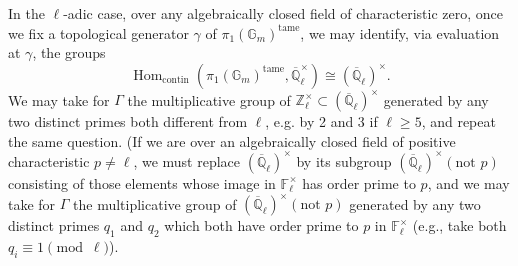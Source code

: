 In the \(\ell\)-adic case, over any algebraically closed field of characteristic zero, once we fix a topological generator \(\gamma\) of \(\pi_1(\mathbb{G}_m)^{\mathrm{tame}}\), we may identify, via evaluation at \(\gamma\), the groups
\[
\operatorname{Hom}_{\mathrm{contin}}(\pi_1(\mathbb{G}_m)^{\mathrm{tame}},\overline{\mathbb{Q}}_\ell^{\times})\cong(\overline{\mathbb{Q}}_\ell)^{\times}.
\]
We may take for \(\Gamma\) the multiplicative group of \(\mathbb{Z}_\ell^{\times}\subset(\overline{\mathbb{Q}}_\ell)^{\times}\) generated by any two distinct primes both different from \(\ell\), e.g. by 2 and 3 if \(\ell\geq 5\), and repeat the same question. (If we are over an algebraically closed field of positive characteristic \(p\ne\ell\), we must replace \((\overline{\mathbb{Q}}_\ell)^{\times}\) by its subgroup \((\overline{\mathbb{Q}}_\ell)^{\times}(\text{not }p)\) consisting of those elements whose image in \(\mathbb{F}_\ell^{\times}\) has order prime to \(p\), and we may take for \(\Gamma\) the multiplicative group of \((\overline{\mathbb{Q}}_\ell)^{\times}(\text{not }p)\) generated by any two distinct primes \(q_1\) and \(q_2\) which both have order prime to \(p\) in \(\mathbb{F}_\ell^{\times}\) (e.g., take both \(q_i\equiv 1\pmod{\ell}\)).
